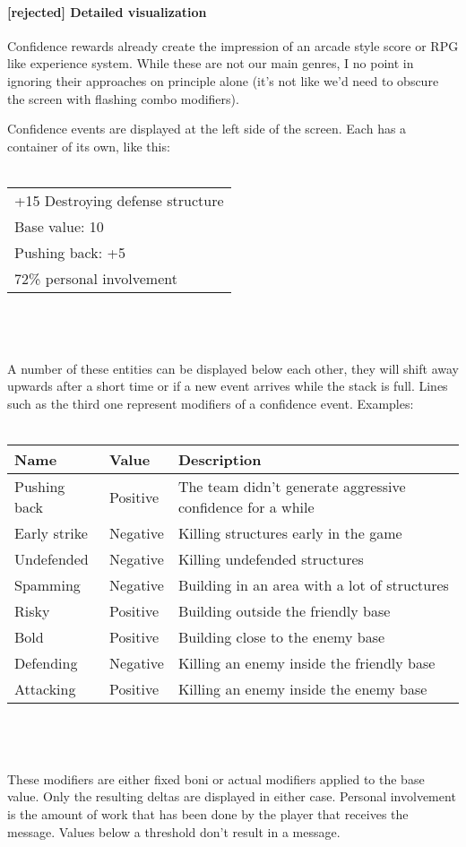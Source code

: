 \documentclass{scrartcl}
\newcommand{\rejected} [0]{\textcolor{rejected} {\textbf{[rejected] }}}
\begin{document}
\paragraph{\rejected Detailed visualization}
\label{detailed-visualization}

Confidence rewards already create the impression of an arcade style score or RPG like experience system. While these are not our main genres, I no point in ignoring their approaches on principle alone (it's not like we'd need to obscure the screen with flashing combo modifiers).

Confidence events are displayed at the left side of the screen. Each has a container of its own, like this:
\\\\
\begin{tabular}{|l|}
\hline
+15 Destroying defense structure\\
Base value: 10\\
Pushing back: +5\\
72\% personal involvement\\
\hline
\end{tabular}
\\\\\\
A number of these entities can be displayed below each other, they will shift away upwards after a short time or if a new event arrives while the stack is full. Lines such as the third one represent modifiers of a confidence event. Examples:
\\\\
\begin{tabular}{l|l|l}
	Name         & Value    & Description\\
	\hline
	Pushing back & Positive & The team didn't generate aggressive confidence for a while\\
	Early strike & Negative & Killing structures early in the game\\
	Undefended   & Negative & Killing undefended structures\\
	Spamming     & Negative & Building in an area with a lot of structures\\
	Risky        & Positive & Building outside the friendly base\\
	Bold         & Positive & Building close to the enemy base\\
	Defending    & Negative & Killing an enemy inside the friendly base\\
	Attacking    & Positive & Killing an enemy inside the enemy base\\
\end{tabular}
\\\\\\
These modifiers are either fixed boni or actual modifiers applied to the base value. Only the resulting deltas are displayed in either case. Personal involvement is the amount of work that has been done by the player that receives the message. Values below a threshold don't result in a message.
\end{document}
